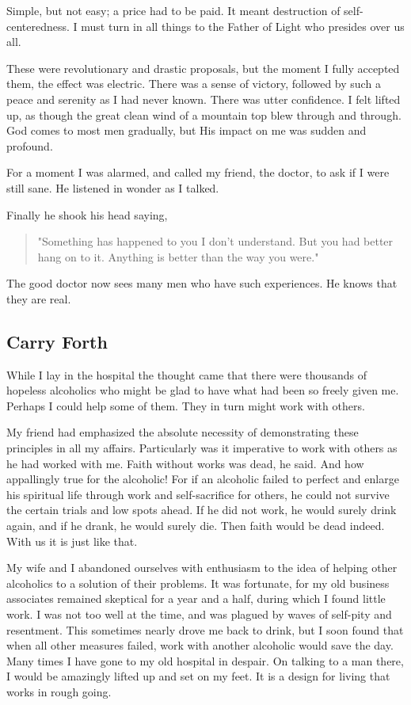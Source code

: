 Simple, but not easy; a price had to be paid.
It meant destruction of self-centeredness.
I must turn in all things to the Father of Light who presides over us all.

These were revolutionary and drastic proposals, but the moment I fully accepted them, the effect was electric.
There was a sense of victory, followed by such a peace and serenity as I had never known.
There was utter confidence.
I felt lifted up, as though the great clean wind of a mountain top blew through and through.
God comes to most men gradually, but His impact on me was sudden and profound.

For a moment I was alarmed, and called my friend, the doctor, to ask if I were still sane.
He listened in wonder as I talked.

Finally he shook his head saying,
\begin{quote}
"Something has happened to you I don't understand.
But you had better hang on to it.
Anything is better than the way you were."
\end{quote}
The good doctor now sees many men who have such experiences.
He knows that they are real.


\subsection{Carry Forth}

While I lay in the hospital the thought came that there were thousands of hopeless alcoholics who might be glad to have what had been so freely given me.
Perhaps I could help some of them.
They in turn might work with others.

My friend had emphasized the absolute necessity of demonstrating these principles in all my affairs.
Particularly was it imperative to work with others as he had worked with me.
Faith without works was dead, he said.
And how appallingly true for the alcoholic!
For if an alcoholic failed to perfect and enlarge his spiritual life through work and self-sacrifice for others, he could not survive the certain trials and low spots ahead.
If he did not work, he would surely drink again, and if he drank, he would surely die.
Then faith would be dead indeed.
With us it is just like that.

My wife and I abandoned ourselves with enthusiasm to the idea of helping other alcoholics to a solution of their problems.
It was fortunate, for my old business associates remained skeptical for a year and a half, during which I found little work.
I was not too well at the time, and was plagued by waves of self-pity and resentment.
This sometimes nearly drove me back to drink, but I soon found that when all other measures failed, work with another alcoholic would save the day.
Many times I have gone to my old hospital in despair.
On talking to a man there, I would be amazingly lifted up and set on my feet.
It is a design for living that works in rough going.


